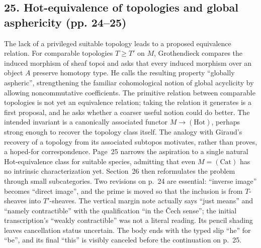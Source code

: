 \documentclass[10pt,oneside]{book}
\begin{document}
\subsection*{25. Hot-equivalence of topologies and global asphericity (pp. 24--25)}
The lack of a privileged suitable topology leads to a proposed equivalence relation. For comparable topologies $T\geq T'$ on $M$, Grothendieck compares the induced morphism of sheaf topoi and asks that every induced morphism over an object $A$ preserve homotopy type. He calls the resulting property ``globally aspheric'', strengthening the familiar cohomological notion of global acyclicity by allowing noncommutative coefficients. The primitive relation between comparable topologies is not yet an equivalence relation; taking the relation it generates is a first proposal, and he asks whether a coarser useful notion could do better. The intended invariant is a canonically associated functor $M\to(\mathrm{Hot})$, perhaps strong enough to recover the topology class itself. The analogy with Giraud's recovery of a topology from its associated subtopos motivates, rather than proves, a hoped-for correspondence. Page~25 narrows the aspiration to a single natural Hot-equivalence class for suitable species, admitting that even $M=(\mathrm{Cat})$ has no intrinsic characterization yet. Section~26 then reformulates the problem through small subcategories. Two revisions on p.~24 are essential: ``inverse image'' becomes ``direct image'', and the prime is moved so that the inclusion is from $T$-sheaves into $T'$-sheaves. The vertical margin note actually says ``just means'' and ``namely contractible'' with the qualification ``in the Čech sense''; the initial transcription's ``weakly contractible'' was not a literal reading. Its pencil shading leaves cancellation status uncertain. The body ends with the typed slip ``he'' for ``be'', and its final ``this'' is visibly canceled before the continuation on p.~25.
\end{document}
